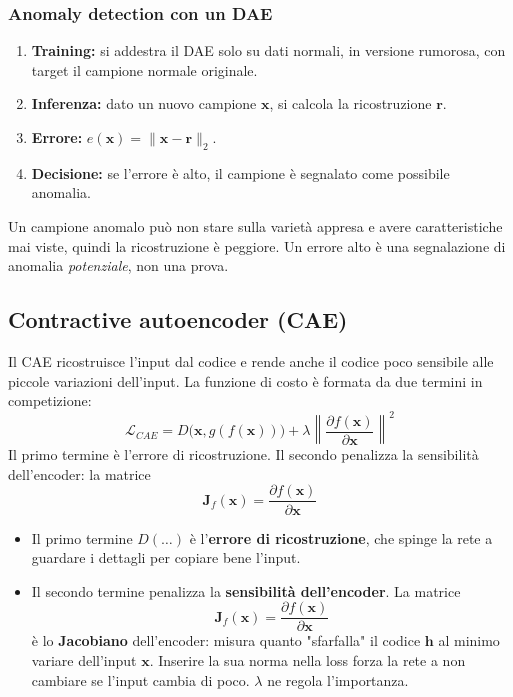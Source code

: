 \documentclass[11pt,a4paper]{article}
\begin{document}
\subsubsection{Anomaly detection con un DAE}
\begin{enumerate}
  \item \textbf{Training:} si addestra il DAE solo su dati normali, in versione
        rumorosa, con target il campione normale originale.
  \item \textbf{Inferenza:} dato un nuovo campione $\mathbf{x}$, si calcola
        la ricostruzione $\mathbf{r}$.
  \item \textbf{Errore:} $e(\mathbf{x})=\|\mathbf{x}-\mathbf{r}\|_2$.
  \item \textbf{Decisione:} se l'errore è alto, il campione è segnalato come
        possibile anomalia.
\end{enumerate}
Un campione anomalo può non stare sulla varietà appresa e avere caratteristiche
mai viste, quindi la ricostruzione è peggiore. Un errore alto è una
segnalazione di anomalia \emph{potenziale}, non una prova.

\subsection{Contractive autoencoder (CAE)}

Il CAE ricostruisce l'input dal codice e rende anche il codice poco sensibile
alle piccole variazioni dell'input.
La funzione di costo è formata da due termini in competizione:
\[
\mathcal{L}_{CAE}=D\big(\mathbf{x},g(f(\mathbf{x}))\big)
+\lambda\left\|\frac{\partial f(\mathbf{x})}{\partial\mathbf{x}}\right\|^2
\]
Il primo termine è l'errore di ricostruzione. Il secondo penalizza la
sensibilità dell'encoder: la matrice
\[
\mathbf{J}_f(\mathbf{x})=\frac{\partial f(\mathbf{x})}{\partial\mathbf{x}}
\]

\begin{itemize}
    \item Il primo termine $D(\dots)$ è l'\textbf{errore di ricostruzione}, che spinge la rete a guardare i 
    dettagli per copiare bene l'input.
    \item Il secondo termine penalizza la \textbf{sensibilità dell'encoder}. La matrice
    \[ \mathbf{J}_f(\mathbf{x})=\frac{\partial f(\mathbf{x})}{\partial\mathbf{x}} \]
    è lo \textbf{Jacobiano} dell'encoder: misura quanto "sfarfalla" il codice $\mathbf{h}$ al minimo 
    variare dell'input $\mathbf{x}$. Inserire la sua norma nella loss forza la rete a non cambiare se 
    l'input cambia di poco. $\lambda$ ne regola l'importanza.
\end{itemize}
\end{document}
